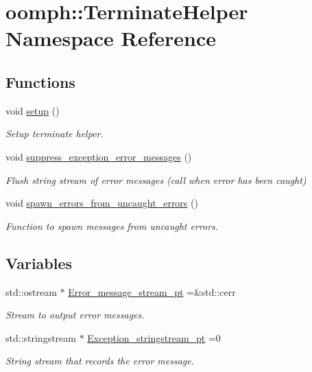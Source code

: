 \hypertarget{namespaceoomph_1_1TerminateHelper}{}\section{oomph\+:\+:Terminate\+Helper Namespace Reference}
\label{namespaceoomph_1_1TerminateHelper}
\subsection*{Functions}
\begin{DoxyCompactItemize}
\item 
void \hyperlink{namespaceoomph_1_1TerminateHelper_a38ec1b047a4438b6eba8a21b669c229d}{setup} ()
\begin{DoxyCompactList}\small\item\em Setup terminate helper. \end{DoxyCompactList}\item 
void \hyperlink{namespaceoomph_1_1TerminateHelper_a2b5ff4c65cd6891d1852d18ff4b8d9ff}{suppress\+\_\+exception\+\_\+error\+\_\+messages} ()
\begin{DoxyCompactList}\small\item\em Flush string stream of error messages (call when error has been caught) \end{DoxyCompactList}\item 
void \hyperlink{namespaceoomph_1_1TerminateHelper_a9651e6be0ad4ac01e26242c1fd4a66a2}{spawn\+\_\+errors\+\_\+from\+\_\+uncaught\+\_\+errors} ()
\begin{DoxyCompactList}\small\item\em Function to spawn messages from uncaught errors. \end{DoxyCompactList}\end{DoxyCompactItemize}
\subsection*{Variables}
\begin{DoxyCompactItemize}
\item 
std\+::ostream $\ast$ \hyperlink{namespaceoomph_1_1TerminateHelper_af6addb95de25061844f952c23999d2bb}{Error\+\_\+message\+\_\+stream\+\_\+pt} =\&std\+::cerr
\begin{DoxyCompactList}\small\item\em Stream to output error messages. \end{DoxyCompactList}\item 
std\+::stringstream $\ast$ \hyperlink{namespaceoomph_1_1TerminateHelper_ad77707e2dee91388903b687945b908ff}{Exception\+\_\+stringstream\+\_\+pt} =0
\begin{DoxyCompactList}\small\item\em String stream that records the error message. \end{DoxyCompactList}\end{DoxyCompactItemize}


